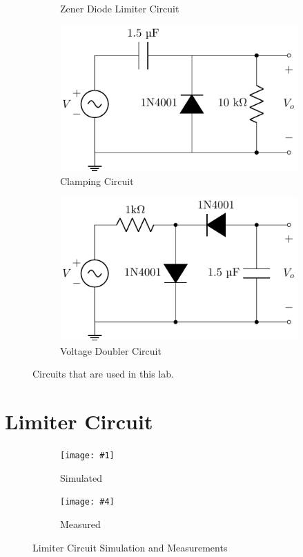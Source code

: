 \documentclass{../../ece-report}
\newcommand{\twosubfigures}[6]{
  \begin{subfigure}{0.45\textwidth}
    \texttt{[image: \#1]}
    \caption{#2}
    \label{#3}
  \end{subfigure}
  \begin{subfigure}{0.45\textwidth}
    \texttt{[image: \#4]}
    \caption{#5}
    \label{#6}
  \end{subfigure}
}
\begin{document}
\begin{figure}[h!]
\begin{subfigure}{.45\textwidth}
    \caption{Zener Diode Limiter Circuit}
    \label{fig:circuit_b}
  \end{subfigure}
  \begin{subfigure}{.45\textwidth}
    \includegraphics[width=\textwidth]{../circuits/circuit_c.pdf}
    \caption{Clamping Circuit}
    \label{fig:circuit_c}
  \end{subfigure}
  \begin{subfigure}{.45\textwidth}
    \includegraphics[width=\textwidth]{../circuits/circuit_d.pdf}
    \caption{Voltage Doubler Circuit}
    \label{fig:circuit_d}
  \end{subfigure}
  \caption{Circuits that are used in this lab.}
  \label{fig:ciruits}
\end{figure}

\section{Limiter Circuit}

\begin{figure}[h!]
  \centering
  \twosubfigures{../plots/circuit_a/pdf/a_sim_xy.pdf}{Simulated}{fig:simulated}
                {../plots/circuit_a/pdf/a_meas_xy.pdf}{Measured}{fig:measured}
  \caption{Limiter Circuit Simulation and Measurements}
  \label{fig:limiter_results}
\end{figure}
\end{document}
